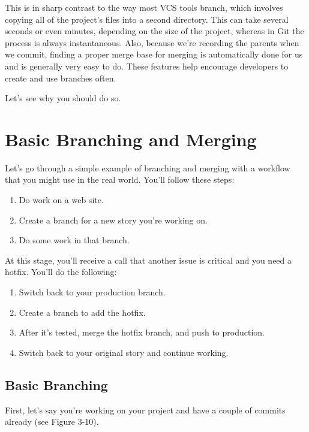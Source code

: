 \documentclass[a4paper]{book}
\begin{document}
This is in sharp contrast to the way most VCS tools branch, which involves copying all of the project's files into a second directory. This can take several seconds or even minutes, depending on the size of the project, whereas in Git the process is always instantaneous. Also, because we're recording the parents when we commit, finding a proper merge base for merging is automatically done for us and is generally very easy to do. These features help encourage developers to create and use branches often.

Let's see why you should do so.

\section{Basic Branching and Merging}\label{basic-branching-and-merging}

Let's go through a simple example of branching and merging with a workflow that you might use in the real world. You'll follow these steps:

\begin{enumerate}
\def\labelenumi{\arabic{enumi}.}
\itemsep1pt\parskip0pt
\item
  Do work on a web site.
\item
  Create a branch for a new story you're working on.
\item
  Do some work in that branch.
\end{enumerate}

At this stage, you'll receive a call that another issue is critical and you need a hotfix. You'll do the following:

\begin{enumerate}
\def\labelenumi{\arabic{enumi}.}
\itemsep1pt\parskip0pt
\item
  Switch back to your production branch.
\item
  Create a branch to add the hotfix.
\item
  After it's tested, merge the hotfix branch, and push to production.
\item
  Switch back to your original story and continue working.
\end{enumerate}

\subsection{Basic Branching}\label{basic-branching}

First, let's say you're working on your project and have a couple of commits already (see Figure 3-10).
\end{document}
